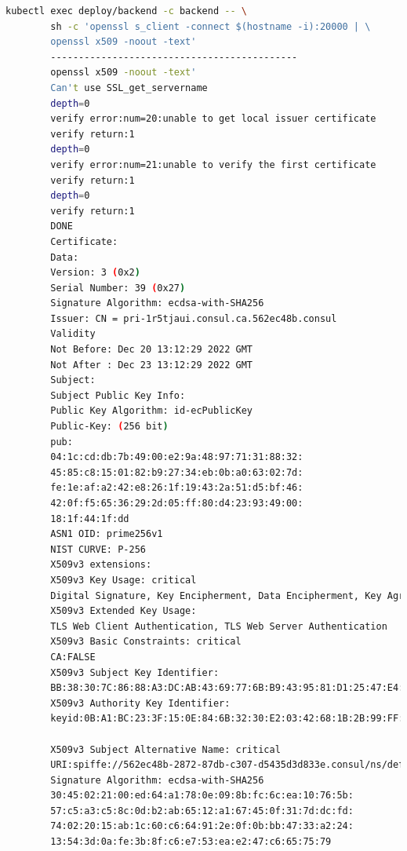\documentclass[12pt,a4paper]{report}
\begin{document}
	\hspace{0.3cm}{Tiếp theo đấy, chúng ta sẽ kiểm tra xem thông tin chứng chỉ mà Consul tạo ra cho ứng dụng. Để kiểm tra, đầu tiên chúng ta cần truy cập được vào trong container ứng dụng với câu lệnh sau:}
	\begin{lstlisting}[language=Bash]
		kubectl exec deploy/backend -c backend -- \
		sh -c 'openssl s_client -connect $(hostname -i):20000 | \
		openssl x509 -noout -text'
		--------------------------------------------
		openssl x509 -noout -text'
		Can't use SSL_get_servername
		depth=0
		verify error:num=20:unable to get local issuer certificate
		verify return:1
		depth=0
		verify error:num=21:unable to verify the first certificate
		verify return:1
		depth=0
		verify return:1
		DONE
		Certificate:
		Data:
		Version: 3 (0x2)
		Serial Number: 39 (0x27)
		Signature Algorithm: ecdsa-with-SHA256
		Issuer: CN = pri-1r5tjaui.consul.ca.562ec48b.consul
		Validity
		Not Before: Dec 20 13:12:29 2022 GMT
		Not After : Dec 23 13:12:29 2022 GMT
		Subject:
		Subject Public Key Info:
		Public Key Algorithm: id-ecPublicKey
		Public-Key: (256 bit)
		pub:
		04:1c:cd:db:7b:49:00:e2:9a:48:97:71:31:88:32:
		45:85:c8:15:01:82:b9:27:34:eb:0b:a0:63:02:7d:
		fe:1e:af:a2:42:e8:26:1f:19:43:2a:51:d5:bf:46:
		42:0f:f5:65:36:29:2d:05:ff:80:d4:23:93:49:00:
		18:1f:44:1f:dd
		ASN1 OID: prime256v1
		NIST CURVE: P-256
		X509v3 extensions:
		X509v3 Key Usage: critical
		Digital Signature, Key Encipherment, Data Encipherment, Key Agreement
		X509v3 Extended Key Usage:
		TLS Web Client Authentication, TLS Web Server Authentication
		X509v3 Basic Constraints: critical
		CA:FALSE
		X509v3 Subject Key Identifier:
		BB:38:30:7C:86:88:A3:DC:AB:43:69:77:6B:B9:43:95:81:D1:25:47:E4:FA:9C:D6:AB:C2:A1:FE:99:51:FA:F7
		X509v3 Authority Key Identifier:
		keyid:0B:A1:BC:23:3F:15:0E:84:6B:32:30:E2:03:42:68:1B:2B:99:FF:7F:78:F1:71:0B:9D:70:5A:C0:F0:DE:66:A0
		
		X509v3 Subject Alternative Name: critical
		URI:spiffe://562ec48b-2872-87db-c307-d5435d3d833e.consul/ns/default/dc/dc1/svc/backend
		Signature Algorithm: ecdsa-with-SHA256
		30:45:02:21:00:ed:64:a1:78:0e:09:8b:fc:6c:ea:10:76:5b:
		57:c5:a3:c5:8c:0d:b2:ab:65:12:a1:67:45:0f:31:7d:dc:fd:
		74:02:20:15:ab:1c:60:c6:64:91:2e:0f:0b:bb:47:33:a2:24:
		13:54:3d:0a:fe:3b:8f:c6:e7:53:ea:e2:47:c6:65:75:79
	\end{lstlisting}
	\hspace{1.0cm}{Đây là chứng chỉ mà Consul tạo ra để mã hoá các dữ liệu được truyền qua nhau thông qua proxy. Các chứng chỉ này được tạo ra bởi Consul, ở đây Consul đóng vai trò là một cơ quan cấp chứng chỉ và cấp cho mỗi Service. Dưới đây là cách mà Consul tạo ra chứng chỉ để mã hoá và dùng chứng chỉ để giải mã dữ liệu.}
\end{document}
